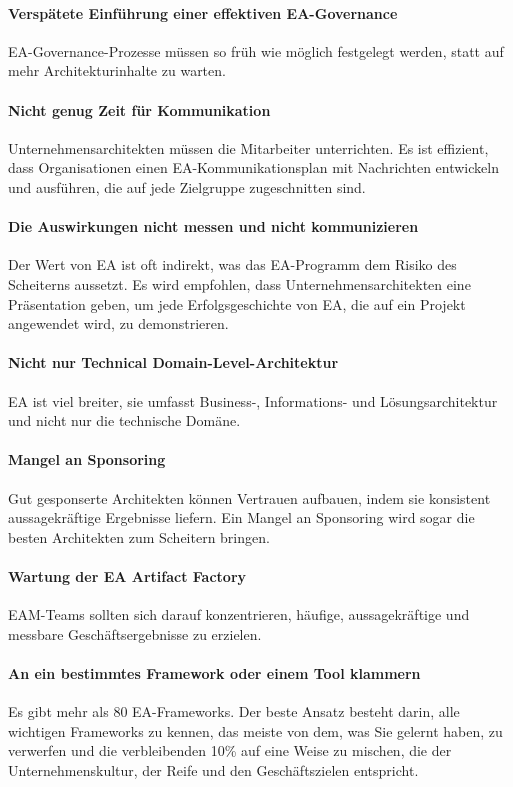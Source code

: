 \documentclass[doc]{apa6}
\begin{document}
\paragraph{Verspätete Einführung einer effektiven EA-Governance} EA-Governance-Prozesse müssen so früh wie möglich festgelegt werden, statt auf mehr Architekturinhalte zu warten.
\paragraph{Nicht genug Zeit für Kommunikation} Unternehmensarchitekten müssen die Mitarbeiter unterrichten. Es ist effizient, dass Organisationen einen EA-Kommunikationsplan mit Nachrichten entwickeln und ausführen, die auf jede Zielgruppe zugeschnitten sind.
\paragraph{Die Auswirkungen nicht messen und nicht kommunizieren} Der Wert von EA ist oft indirekt, was das EA-Programm dem Risiko des Scheiterns aussetzt. Es wird empfohlen, dass Unternehmensarchitekten eine Präsentation geben, um jede Erfolgsgeschichte von EA, die auf ein Projekt angewendet wird, zu demonstrieren.
\paragraph{Nicht nur Technical Domain-Level-Architektur} EA ist viel breiter, sie umfasst Business-, Informations- und Lösungsarchitektur und nicht nur die technische Domäne. \autocite{Ojo2016}
\paragraph{Mangel an Sponsoring} Gut gesponserte Architekten können Vertrauen aufbauen, indem sie konsistent aussagekräftige Ergebnisse liefern. Ein Mangel an Sponsoring wird sogar die besten Architekten zum Scheitern bringen.
\paragraph{Wartung der EA Artifact Factory} EAM-Teams sollten sich darauf konzentrieren, häufige, aussagekräftige und messbare Geschäftsergebnisse zu erzielen.
\paragraph{An ein bestimmtes Framework oder einem Tool klammern} Es gibt mehr als 80 EA-Frameworks. Der beste Ansatz besteht darin, alle wichtigen Frameworks zu kennen, das meiste von dem, was Sie gelernt haben, zu verwerfen und die verbleibenden 10\% auf eine Weise zu mischen, die der Unternehmenskultur, der Reife und den Geschäftszielen entspricht.
\end{document}

